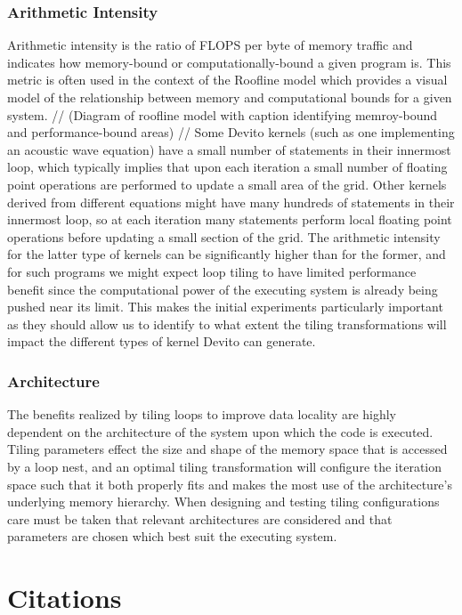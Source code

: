 \documentclass[a4paper,12pt,twoside]{report}
\begin{document}
\subsection*{Arithmetic Intensity}
Arithmetic intensity is the ratio of FLOPS per byte of memory traffic and indicates how memory-bound or computationally-bound a given program is.
This metric is often used in the context of the Roofline model which provides a visual model of the relationship between memory and computational bounds for a
given system. 
//
(Diagram of roofline model with caption  identifying memroy-bound and performance-bound areas)
//
Some Devito kernels (such as one implementing an acoustic wave equation) have a small number of statements in their innermost loop, which typically
implies that upon each iteration a small number of floating point operations are performed to update a small area of the grid. Other kernels derived from different 
equations might have many hundreds of statements in their innermost loop, so at each iteration many statements perform local floating point operations before updating
a small section of the grid. The arithmetic intensity for the latter type of kernels can be significantly higher than for the former, and for such programs
we might expect loop tiling to have limited performance benefit since the computational power of the executing system is already being pushed near its limit. This makes
the initial experiments particularly important as they should allow us to identify to what extent the tiling transformations will impact the different types of kernel
Devito can generate.

\subsection*{Architecture}
The benefits realized by tiling loops to improve data locality are highly dependent on the architecture of the system upon which the code is executed. Tiling parameters
effect the size and shape of the memory space that is accessed by a loop nest, and an optimal tiling transformation will configure the iteration space such that it both
properly fits and makes the most use of the architecture's underlying memory hierarchy. When designing and testing tiling configurations care must be taken that
relevant architectures are considered and that parameters are chosen which best suit the executing system.

\chapter{Citations}


\end{document}
